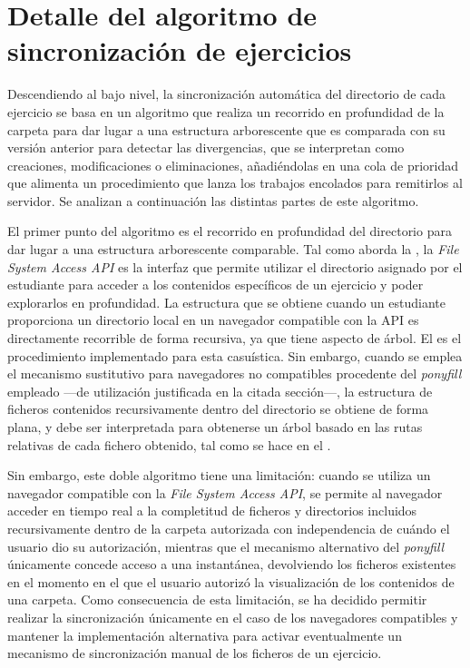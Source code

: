 \chapter{Detalle del algoritmo de sincronización de ejercicios}
\label{anx:bajoNivelRF11}

Descendiendo al bajo nivel, la sincronización automática del directorio de cada ejercicio se basa en un algoritmo que realiza un recorrido en profundidad de la carpeta para dar lugar a una estructura arborescente que es comparada con su versión anterior para detectar las divergencias, que se interpretan como creaciones, modificaciones o eliminaciones, añadiéndolas en una cola de prioridad que alimenta un procedimiento que lanza los trabajos encolados para remitirlos al servidor. Se analizan a continuación las distintas partes de este algoritmo.

El primer punto del algoritmo es el recorrido en profundidad del directorio para dar lugar a una estructura arborescente comparable. Tal como aborda la , la \textit{File System Access API} es la interfaz que permite utilizar el directorio asignado por el estudiante para acceder a los contenidos específicos de un ejercicio y poder explorarlos en profundidad. La estructura que se obtiene cuando un estudiante proporciona un directorio local en un navegador compatible con la API es directamente recorrible de forma recursiva, ya que tiene aspecto de árbol. El  es el procedimiento implementado para esta casuística. Sin embargo, cuando se emplea el mecanismo sustitutivo para navegadores no compatibles procedente del \textit{ponyfill} empleado ---de utilización justificada en la citada sección---, la estructura de ficheros contenidos recursivamente dentro del directorio se obtiene de forma plana, y debe ser interpretada para obtenerse un árbol basado en las rutas relativas de cada fichero obtenido, tal como se hace en el .

Sin embargo, este doble algoritmo tiene una limitación: cuando se utiliza un navegador compatible con la \textit{File System Access API}, se permite al navegador acceder en tiempo real a la completitud de ficheros y directorios incluidos recursivamente dentro de la carpeta autorizada con independencia de cuándo el usuario dio su autorización, mientras que el mecanismo alternativo del \textit{ponyfill} únicamente concede acceso a una instantánea, devolviendo los ficheros existentes en el momento en el que el usuario autorizó la visualización de los contenidos de una carpeta. Como consecuencia de esta limitación, se ha decidido permitir realizar la sincronización únicamente en el caso de los navegadores compatibles y mantener la implementación alternativa para activar eventualmente un mecanismo de sincronización manual de los ficheros de un ejercicio.

